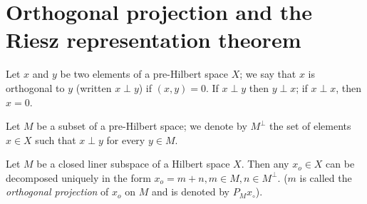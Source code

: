 \section[Orthogonal projection and...]{Orthogonal projection and the Riesz representation theorem}\label{chap2:sec7}

\begin{defi*} %
 Let $x$ and $y$ be two elements of a pre-Hilbert space $X$; we say
 that $x$ is orthogonal to $y$ (written $x \perp y$) if $(x,y) =
 0$. If $x \perp y$ then $y \perp x$; if $x \perp x$, then $x=0$. 
\end{defi*}

Let $M$ be a subset of a pre-Hilbert space; we denote by $M^\perp$ the
set of elements $x \in X$ such that $x \perp y$ for every $y
\in M$. 

\begin{theorem*}
 Let $M$ be a closed liner subspace of a Hilbert space $X$. Then any
 $x_o \in X$ can be decomposed uniquely in the form $x_o =
 m+n, m \in M, n \in M^\perp$. ($m$ is called the
 {\em{orthogonal projection}} of $x_o$ on $M$ and is denoted by $P_M
 x_\circ$). 
\end{theorem*}

